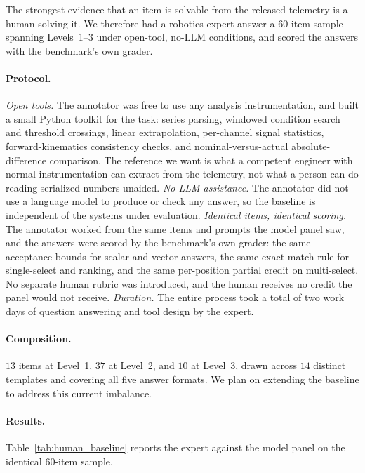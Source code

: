 The strongest evidence that an item is solvable from the released telemetry is a human solving it. We therefore had a robotics expert answer a $60$-item sample spanning Levels~1--3 under open-tool, no-LLM conditions, and scored the answers with the benchmark's own grader.

\paragraph{Protocol.}
\emph{Open tools.} The annotator was free to use any analysis instrumentation, and built a small Python toolkit for the task: series parsing, windowed condition search and threshold crossings, linear extrapolation, per-channel signal statistics, forward-kinematics consistency checks, and nominal-versus-actual absolute-difference comparison. The reference we want is what a competent engineer with normal instrumentation can extract from the telemetry, not what a person can do reading serialized numbers unaided.
\emph{No LLM assistance.} The annotator did not use a language model to produce or check any answer, so the baseline is independent of the systems under evaluation.
\emph{Identical items, identical scoring.} The annotator worked from the same items and prompts the model panel saw, and the answers were scored by the benchmark's own grader: the same acceptance bounds for scalar and vector answers, the same exact-match rule for single-select and ranking, and the same per-position partial credit on multi-select. No separate human rubric was introduced, and the human receives no credit the panel would not receive.
\emph{Duration.} The entire process took a total of two work days of question answering and tool design by the expert.

\paragraph{Composition.}
$13$ items at Level~1, $37$ at Level~2, and $10$ at Level~3, drawn across $14$ distinct templates and covering all five answer formats. We plan on extending the baseline to address this current imbalance.

\paragraph{Results.} Table~\ref{tab:human_baseline} reports the expert against the model panel on the identical $60$-item sample.

